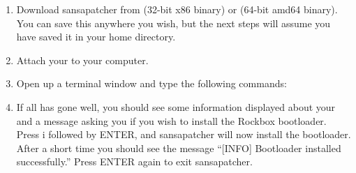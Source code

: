 \begin{enumerate}

\item Download sansapatcher from
 (32-bit x86 
binary) or  
(64-bit amd64 binary). You can save this anywhere you wish, but the next 
steps will assume you have saved it in your home directory.

\item Attach your \dap{} to your computer.

\item Open up a terminal window and type the following commands:



\item If all has gone well, you should see some information displayed about
your \archosplayertype{} and a message asking you if you wish to install the Rockbox
bootloader. Press i followed by ENTER, and sansapatcher will now install the
bootloader. After a short time you should see the message ``[INFO] Bootloader
installed successfully.'' Press ENTER again to exit sansapatcher.
\end{enumerate}
